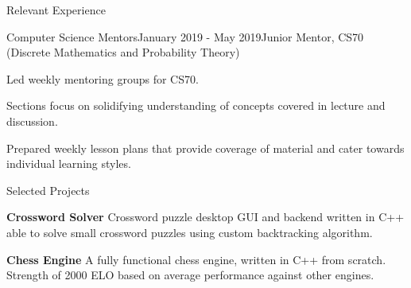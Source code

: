 \documentclass{resume}
\begin{document}
\begin{rSection}{Relevant Experience}

\begin{rSubsection}{Computer Science Mentors}{January 2019 - May 2019}{Junior Mentor, CS70 (Discrete Mathematics and Probability Theory)}{}
\item Led weekly mentoring groups for CS70. 
\item Sections focus on solidifying understanding of concepts covered in lecture and discussion. 
\item Prepared weekly lesson plans that provide coverage of material and cater towards individual learning
styles.
\end{rSubsection}


\end{rSection}




\begin{rSection}{Selected Projects} \itemsep -2pt
\item \textbf{Crossword Solver} Crossword puzzle desktop GUI and backend written in C++ able to solve small crossword puzzles using custom backtracking algorithm.
\item \textbf{Chess Engine} A fully functional chess engine, written in C++ from scratch. Strength of 2000 ELO based on average performance against other engines.


\end{rSection}
\end{document}
